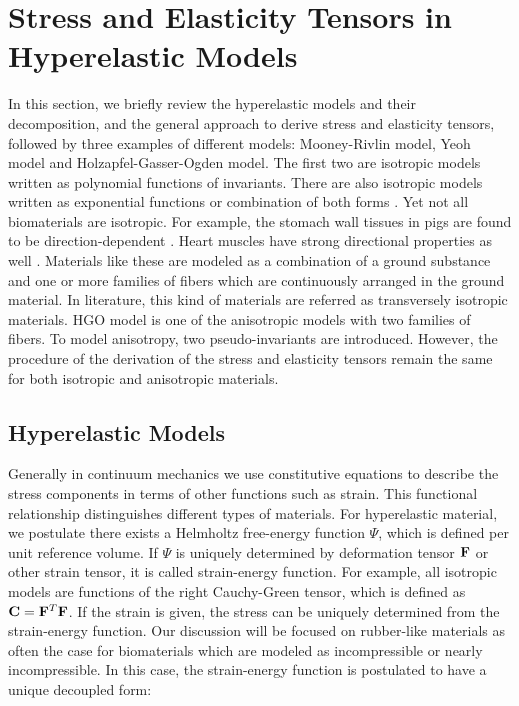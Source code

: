 \section{Stress and Elasticity Tensors in Hyperelastic Models} \label{general}
In this section, we briefly review the hyperelastic models and their decomposition, and the general approach to derive stress and elasticity tensors, followed by three examples of different models: Mooney-Rivlin model, Yeoh model and Holzapfel-Gasser-Ogden model. The first two are isotropic models written as polynomial functions of invariants. There are also isotropic models written as exponential functions or combination of both forms \cite{Fung5, Demiray, Westmann}. 
Yet not all biomaterials are isotropic. For example, the stomach wall tissues in pigs are found to be direction-dependent \cite{Zhao}. Heart muscles have strong directional properties as well \cite{Ramesh}. Materials like these are modeled as a combination of a ground substance and one or more families of fibers which are continuously arranged in the ground material. In literature, this kind of materials are referred as transversely isotropic materials. HGO model is one of the anisotropic models with two families of fibers. To model anisotropy, two pseudo-invariants are introduced. However, the procedure of the derivation of the stress and elasticity tensors remain the same for both isotropic and anisotropic materials.

%
\subsection{Hyperelastic Models}
Generally in continuum mechanics we use constitutive equations to describe the stress components in terms of other functions such as strain. This functional relationship distinguishes different types of materials. For hyperelastic material, we postulate there exists a Helmholtz free-energy function $\Psi$, which is defined per unit reference volume. If $\Psi$ is uniquely determined by deformation tensor $\bold{F}$ or other strain tensor, it is called strain-energy function. For example, all isotropic models are functions of the right Cauchy-Green tensor, which is defined as $\bold{C} = {\bold{F}}^T{\bold{F}}$. If the strain is given, the stress can be uniquely determined from the strain-energy function. Our discussion will be focused on rubber-like materials as often the case for biomaterials which are modeled as incompressible or nearly incompressible. In this case, the strain-energy function is postulated to have a unique decoupled form:

